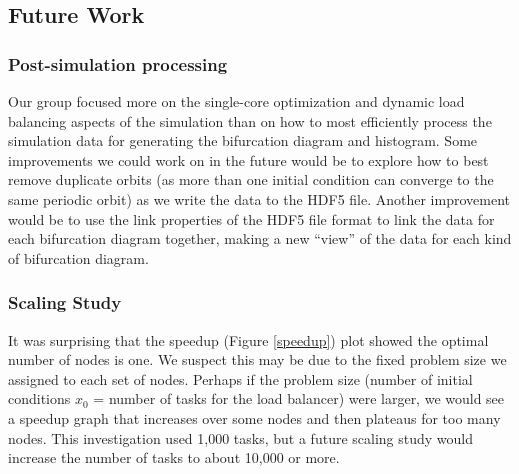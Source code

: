 \documentclass[12pt]{article}
\begin{document}
\subsection{Future Work}
\subsubsection{Post-simulation processing}
Our group focused more on the single-core optimization and dynamic
load balancing aspects of the simulation than on how to most
efficiently process the simulation data for generating the bifurcation
diagram and histogram. Some improvements we could work on in the
future would be to explore how to best remove duplicate orbits (as
more than one initial condition can converge to the same periodic
orbit) as we write the data to the HDF5 file. Another improvement
would be to use the link properties of the HDF5 file format to link
the data for each bifurcation diagram together, making a new ``view''
of the data for each kind of bifurcation diagram. 
\subsubsection{Scaling Study}
It was surprising that the speedup (Figure \ref{speedup}) plot showed
the optimal number of nodes is one. We suspect this may be due to the
fixed problem size we assigned to each set of nodes. Perhaps if the
problem size (number of initial conditions $x_0$ = number of tasks for
the load balancer) were larger, we would see a speedup graph that
increases over some nodes and then plateaus for too many nodes. This
investigation used 1,000 tasks, but a future scaling study would
increase the number of tasks to about 10,000 or more.


\end{document}
